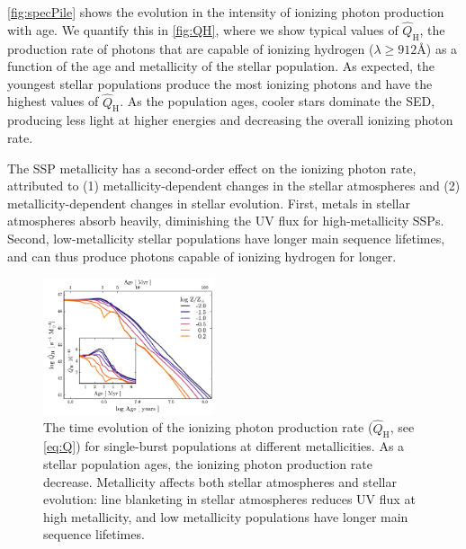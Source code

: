 \documentclass[trackchanges, twocolumn, tighten]{aastex61}
\newcommand{\Fig}[1]{\autoref{fig:#1}}
\newcommand{\Eq}[1]{\autoref{eq:#1}}
\newcommand\lam[1]{\ensuremath{\lambda #1}}
\newcommand{\ang}{\ensuremath{\mbox{\AA}}}
\newcommand{\QHat}{\ensuremath{\hat{Q}_{\mathrm{H}}}}
\begin{document}
\Fig{specPile} shows the evolution in the intensity of ionizing photon production with age. We quantify this in \Fig{QH}, where we show typical values of \QHat{}, the production rate of photons that are capable of ionizing hydrogen ($\lam \geq 912 \ang$) as a function of the age and metallicity of the stellar population. As expected, the youngest stellar populations produce the most ionizing photons and have the highest values of \QHat{}. As the population ages, cooler stars dominate the SED, producing less light at higher energies and decreasing the overall ionizing photon rate.

The SSP metallicity has a second-order effect on the ionizing photon rate, attributed to (1) metallicity-dependent changes in the stellar atmospheres and (2) metallicity-dependent changes in stellar evolution. First, metals in stellar atmospheres absorb heavily, diminishing the UV flux for high-metallicity SSPs. Second, low-metallicity stellar populations have longer main sequence lifetimes, and can thus produce photons capable of ionizing hydrogen for longer.

\begin{figure}
  \begin{centering}
    \includegraphics[width=0.45\textwidth]{f2.pdf}
    \caption{The time evolution of the ionizing photon production rate (\QHat{}, see \Eq{Q}) for single-burst populations at different metallicities. As a stellar population ages, the ionizing photon production rate decrease. Metallicity affects both stellar atmospheres and stellar evolution: line blanketing in stellar atmospheres reduces UV flux at high metallicity, and low metallicity populations have longer main sequence lifetimes.}
    \label{fig:QH}
  \end{centering}
\end{figure}
\end{document}
